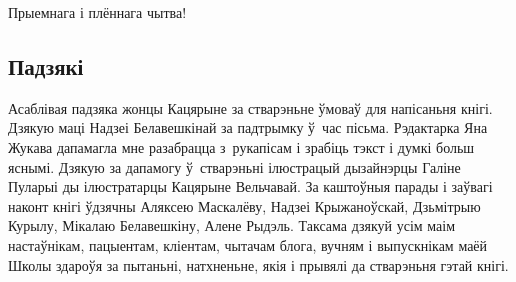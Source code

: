 Прыемнага і плённага чытва!


\subsection*{Падзякі}

Асаблівая падзяка жонцы Кацярыне за стварэньне ўмоваў для напісаньня кнігі. Дзякую маці Надзеі Белавешкінай за падтрымку ў~час пісьма. Рэдактарка Яна Жукава дапамагла мне разабрацца з~рукапісам і зрабіць тэкст і думкі больш яснымі. Дзякую за дапамогу ў~стварэньні ілюстрацый дызайнэрцы Галіне Пуларыі ды ілюстратарцы Кацярыне Вельчавай. За каштоўныя парады і заўвагі наконт кнігі ўдзячны Аляксею Маскалёву, Надзеі Крыжаноўскай, Дзьмітрыю Курылу, Мікалаю Белавешкіну, Алене Рыдэль. Таксама дзякуй усім маім настаўнікам, пацыентам, кліентам, чытачам блога, вучням і выпускнікам маёй Школы здароўя за пытаньні, натхненьне, якія і прывялі да стварэньня гэтай кнігі.
